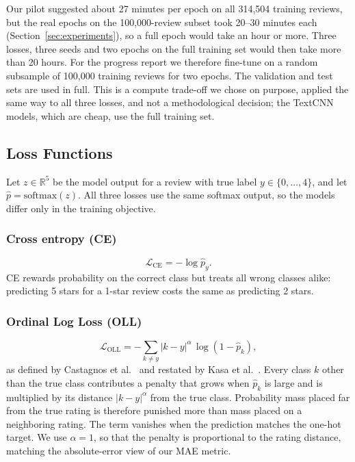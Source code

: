 Our pilot suggested about 27 minutes per epoch on all 314{,}504 training reviews, but the real epochs on the 100{,}000-review subset took 20--30 minutes each (Section~\ref{sec:experiments}), so a full epoch would take an hour or more. Three losses, three seeds and two epochs on the full training set would then take more than 20 hours. For the progress report we therefore fine-tune on a random subsample of 100{,}000 training reviews for two epochs. The validation and test sets are used in full. This is a compute trade-off we chose on purpose, applied the same way to all three losses, and not a methodological decision; the TextCNN models, which are cheap, use the full training set.

\subsection{Loss Functions}
\label{sec:losses}
Let $z\in\mathbb{R}^5$ be the model output for a review with true label $y\in\{0,\dots,4\}$, and let $\hat{p}=\mathrm{softmax}(z)$. All three losses use the same softmax output, so the models differ only in the training objective.

\subsubsection{Cross entropy (CE)}
\begin{equation}
\mathcal{L}_{\mathrm{CE}} = -\log \hat{p}_y .
\end{equation}
CE rewards probability on the correct class but treats all wrong classes alike: predicting 5 stars for a 1-star review costs the same as predicting 2 stars.

\subsubsection{Ordinal Log Loss (OLL)}
\begin{equation}
\mathcal{L}_{\mathrm{OLL}} = -\sum_{k\ne y} |k-y|^{\alpha}\,\log\!\left(1-\hat{p}_k\right),
\end{equation}
as defined by Castagnos et al.~\cite{castagnos2022} and restated by Kasa et al.~\cite{kasa2024}. Every class $k$ other than the true class contributes a penalty that grows when $\hat{p}_k$ is large and is multiplied by its distance $|k-y|^\alpha$ from the true class. Probability mass placed far from the true rating is therefore punished more than mass placed on a neighboring rating. The term vanishes when the prediction matches the one-hot target. We use $\alpha=1$, so that the penalty is proportional to the rating distance, matching the absolute-error view of our MAE metric.

